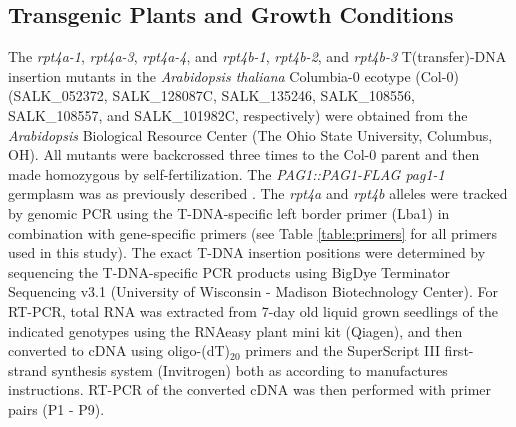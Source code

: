 \subsection{Transgenic Plants and Growth Conditions}
The \textit{rpt4a-1},\textit{ rpt4a-3},\textit{ rpt4a-4}, and \textit{rpt4b-1}, \textit{rpt4b-2}, and \textit{rpt4b-3} T(transfer)-DNA insertion mutants in the \textit{Arabidopsis thaliana} Columbia-0 ecotype (Col-0) (SALK\_052372, SALK\_128087C, SALK\_135246, SALK\_108556, SALK\_108557, and SALK\_101982C, respectively) were obtained from the \textit{Arabidopsis} Biological Resource Center (The Ohio State University, Columbus, OH). All mutants were backcrossed three times to the Col-0 parent and then made homozygous by self-fertilization. The \textit{PAG1::PAG1-FLAG pag1-1} germplasm was as previously described \citep{book10}. The \textit{rpt4a} and \textit{rpt4b} alleles were tracked by genomic PCR using the T-DNA-specific left border primer (Lba1) in combination with gene-specific primers (see Table \ref{table:primers} for all primers used in this study). The exact T-DNA insertion positions were determined by sequencing the T-DNA-specific PCR products using BigDye Terminator Sequencing v3.1 (University of Wisconsin - Madison Biotechnology Center). For RT-PCR, total RNA was extracted from 7-day old liquid grown seedlings of the indicated genotypes using the RNAeasy plant mini kit (Qiagen), and then converted to cDNA using oligo-(dT)$_{20}$ primers and the SuperScript III first-strand synthesis system (Invitrogen) both as according to manufactures instructions.  RT-PCR of the converted cDNA was then performed with primer pairs (P1 - P9). 

